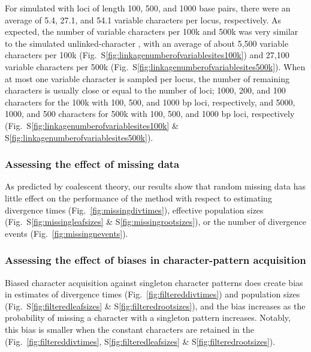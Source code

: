 \ifembed{



}{}

For simulated \datasets with loci of length 100, 500, and 1000 base pairs, there
were an average of 5.4, 27.1, and 54.1 variable characters per locus,
respectively.
As expected, the number of variable characters per 100k and 500k \dataset was
very similar to the simulated unlinked-character \datasets, with an average of
about
5,500 variable characters per 100k \dataset
(Fig.~S\ref{fig:linkagenumberofvariablesites100k})
and
27,100 variable characters per 500k \dataset
(Fig.~S\ref{fig:linkagenumberofvariablesites500k}).
When at most one variable character is sampled per locus, the
number of remaining characters is usually close or equal to the
number of loci;
1000, 200, and 100 characters for the 100k \datasets
with 100, 500, and 1000 bp loci, respectively, and
5000, 1000, and 500 characters for 500k \datasets
with 100, 500, and 1000 bp loci, respectively
(Fig.\ 
S\ref{fig:linkagenumberofvariablesites100k}
\&
S\ref{fig:linkagenumberofvariablesites500k}).


\subsubsection{Assessing the effect of missing data}

As predicted by coalescent theory, our results show that random missing data
has little effect on the performance of the method with respect to estimating
divergence times
(Fig.~\ref{fig:missingdivtimes}),
effective population sizes
(Fig.\ 
S\ref{fig:missingleafsizes}
\&
S\ref{fig:missingrootsizes}), or the number of divergence events
(Fig.~\ref{fig:missingnevents}).

\ifembed{



}{}


\subsubsection{Assessing the effect of biases in character-pattern acquisition}

Biased character acquisition against singleton character patterns does create
bias in estimates of divergence times
(Fig.~\ref{fig:filtereddivtimes}) and
population sizes
(Fig.\ 
S\ref{fig:filteredleafsizes}
\&
S\ref{fig:filteredrootsizes}), and the bias increases as the probability of
missing a character with a singleton pattern increases.
Notably, this bias is smaller when the constant characters are retained in
the \dataset
(Fig.\ 
\ref{fig:filtereddivtimes},
S\ref{fig:filteredleafsizes}
\&
S\ref{fig:filteredrootsizes}).

